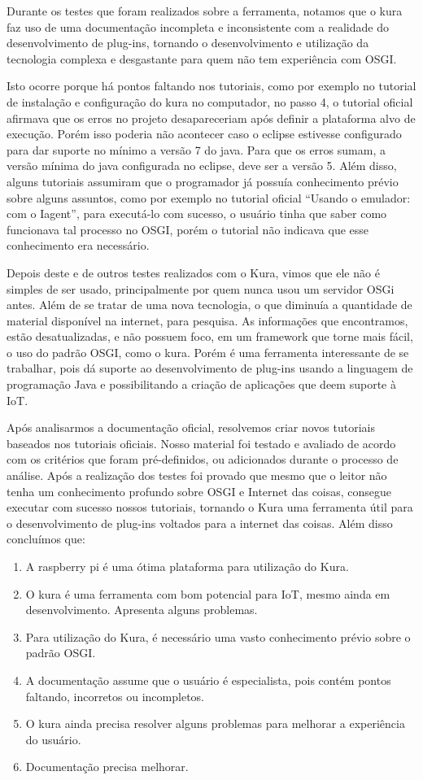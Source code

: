 Durante os testes que foram realizados sobre a ferramenta, notamos que o kura faz uso de uma documentação incompleta e inconsistente com a realidade do desenvolvimento de plug-ins, tornando o desenvolvimento e utilização da tecnologia complexa e desgastante para quem não tem experiência com OSGI.

Isto ocorre porque há pontos faltando nos tutoriais, como por exemplo no tutorial de instalação e configuração do kura no computador, no passo 4, o tutorial oficial afirmava que os erros no projeto desapareceriam após definir a plataforma alvo de execução. Porém isso poderia não acontecer caso o eclipse estivesse configurado para dar suporte no mínimo a versão 7 do java. Para que os erros sumam, a versão mínima do java configurada no eclipse, deve ser a versão 5.
Além disso, alguns tutoriais assumiram que o programador já possuía conhecimento prévio sobre alguns assuntos, como por exemplo no tutorial oficial “Usando o emulador: com o Iagent”, para executá-lo com sucesso, o usuário tinha que saber como funcionava tal processo no OSGI, porém o tutorial não indicava que esse conhecimento era necessário.

Depois deste e de outros testes realizados com o Kura, vimos que ele não é simples de ser usado, principalmente por quem nunca usou um servidor OSGi antes. Além de se tratar de uma nova tecnologia, o que diminuía a quantidade de material disponível na internet, para pesquisa. As informações que encontramos, estão desatualizadas, e não possuem foco, em um framework que torne mais fácil, o uso do padrão OSGI, como o kura. Porém é uma ferramenta interessante de se trabalhar, pois dá suporte ao desenvolvimento de plug-ins usando a linguagem de programação Java e possibilitando a criação de aplicações que deem suporte à IoT.

Após analisarmos a documentação oficial, resolvemos criar novos tutoriais baseados nos tutoriais oficiais. Nosso material foi testado e avaliado de acordo com os critérios que foram pré-definidos, ou adicionados durante o processo de análise. Após a realização dos testes foi provado que mesmo que o leitor não tenha um conhecimento profundo sobre OSGI e Internet das coisas, consegue executar com sucesso nossos tutoriais, tornando o Kura uma ferramenta útil para o desenvolvimento de plug-ins voltados para a internet das coisas. Além disso concluímos que:

\begin{enumerate}
  \item A raspberry pi é uma ótima plataforma para utilização do Kura.
  \item O kura é uma ferramenta com bom potencial para IoT, mesmo ainda em desenvolvimento. Apresenta alguns problemas.
  \item Para utilização do Kura, é necessário uma vasto conhecimento prévio sobre o padrão OSGI.
  \item A documentação assume que o usuário é especialista, pois contém pontos faltando, incorretos ou incompletos.
  \item O kura ainda precisa resolver alguns problemas para melhorar a experiência do usuário.
  \item Documentação precisa melhorar.
\end{enumerate}
